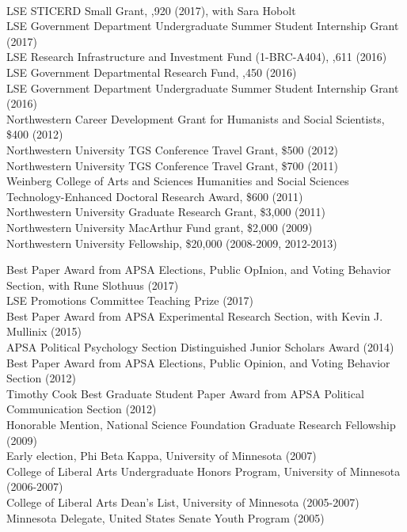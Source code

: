 \documentclass[12pt]{article}
\renewcommand{\section}[1]{\pagebreak[3]%
    \llap{\scshape\smash{\parbox[t]{\marginparwidth}{\raggedright {\color{lg}#1}}}}%
    \vspace{-\baselineskip}\par}
\newcommand{\topic}[1]{\pagebreak[3]\indent {\color{lg}{\footnotesize #1 }}\\}
\newcommand{\entry}[1]{\indent {\color{lg}\guillemotright}\hspace{2pt}#1\vspace{.25em}\\}
\begin{document}
	\topic{Institutional Sources}
	\entry{LSE STICERD Small Grant, ,920 (2017), with Sara Hobolt}
    \entry{LSE Government Department Undergraduate Summer Student Internship Grant (2017)}
    \entry{LSE Research Infrastructure and Investment Fund (1-BRC-A404), \textsterling 11,611 (2016)}
	\entry{LSE Government Departmental Research Fund, ,450 (2016)}
	\entry{LSE Government Department Undergraduate Summer Student Internship Grant (2016)}
	\entry{Northwestern Career Development Grant for Humanists and Social Scientists, \$400 (2012)}
	\entry{Northwestern University TGS Conference Travel Grant, \$500 (2012)}
	\entry{Northwestern University TGS Conference Travel Grant, \$700 (2011)}
	\entry{Weinberg College of Arts and Sciences Humanities and Social Sciences Technology-Enhanced Doctoral Research Award, \$600 (2011)}
	\entry{Northwestern University Graduate Research Grant, \$3,000 (2011)}
	\entry{Northwestern University MacArthur Fund grant, \$2,000 (2009)}
	\entry{Northwestern University Fellowship, \$20,000 (2008-2009, 2012-2013)}

\section{Honors \&\\Awards}
	\entry{Best Paper Award from APSA Elections, Public OpInion, and Voting Behavior Section, with Rune Slothuus (2017)}
	\entry{LSE Promotions Committee Teaching Prize (2017)}
    \entry{Best Paper Award from APSA Experimental Research Section, with Kevin J. Mullinix (2015)}
	\entry{APSA Political Psychology Section Distinguished Junior Scholars Award (2014)}
	\entry{Best Paper Award from APSA Elections, Public Opinion, and Voting Behavior Section (2012)}
	\entry{Timothy Cook Best Graduate Student Paper Award from APSA Political Communication Section (2012)}
	\entry{Honorable Mention, National Science Foundation Graduate Research Fellowship (2009)}
	\entry{Early election, Phi Beta Kappa, University of Minnesota (2007)}
	\entry{College of Liberal Arts Undergraduate Honors Program, University of Minnesota (2006-2007)}
	\entry{College of Liberal Arts Dean's List, University of Minnesota (2005-2007)}
	\entry{Minnesota Delegate, United States Senate Youth Program (2005)}
\end{document}
